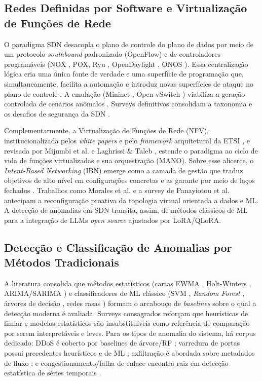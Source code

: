 \documentclass[12pt,a4paper]{article}
\begin{document}
\subsection{Redes Definidas por Software e Virtualização de Funções de Rede}
\label{sec:sdn}

O paradigma SDN desacopla o plano de controle do plano de dados por meio de um
protocolo \textit{southbound} padronizado (OpenFlow) \cite{rA11} e de controladores
programáveis (NOX \cite{rA12}, POX, Ryu \cite{rA116}, OpenDaylight \cite{rA114}, ONOS \cite{rA115}).
Essa centralização lógica cria uma única fonte de verdade e uma superfície de
programação que, simultaneamente, facilita a automação e introduz novas
superfícies de ataque no plano de controle \cite{rA122}\cite{rA123}\cite{rA124}. A emulação
(Mininet \cite{rA14}, Open vSwitch \cite{rA15}) viabiliza a geração controlada de cenários
anômalos \cite{rA19}. Surveys definitivos consolidam a taxonomia e os desafios de
segurança da SDN \cite{rA19}\cite{rA110}.

Complementarmente, a Virtualização de Funções de Rede (NFV), institucionalizada
pelos \textit{white papers} e pelo \textit{framework} arquitetural da ETSI
\cite{rA127}\cite{rA128}\cite{rA129}, e revisada por Mijumbi et al. \cite{rA130}\cite{rA131} e Laghrissi \&
Taleb \cite{rA132}, estende o paradigma ao ciclo de vida de funções virtualizadas e
sua orquestração (MANO). Sobre esse alicerce, o \textit{Intent-Based
Networking} (IBN) emerge como a camada de gestão que traduz objetivos de alto
nível em configurações concretas e as garante por meio de laços fechados
\cite{rA133}. Trabalhos como Morales et al. \cite{rA134} e a survey de Panayiotou et al.
\cite{rA135} antecipam a reconfiguração proativa da topologia virtual orientada a
dados e ML. A detecção de anomalias em SDN transita, assim, de métodos
clássicos de ML \cite{rA126} para a integração de LLMs \textit{open source}
ajustados por LoRA/QLoRA.

\subsection{Detecção e Classificação de Anomalias por Métodos Tradicionais}
\label{sec:ml}

A literatura consolida que métodos estatísticos (cartas EWMA \cite{rA22}, Holt-Winters
\cite{rA21}, ARIMA/SARIMA \cite{rA25}\cite{rA27}) e classificadores de ML clássico (SVM
\cite{rA213}, \textit{Random Forest} \cite{rA210}, árvores de decisão \cite{rA217}, redes
rasas \cite{rA231}) formam o arcabouço de \textit{baselines} sobre o qual a detecção
moderna é avaliada. Surveys consagrados \cite{rA28}\cite{rA29}\cite{rA210}\cite{rA212} reforçam que
heurísticas de limiar e modelos estatísticos são insubstituíveis como
referência de comparação por serem interpretáveis e leves. Para os tipos de
anomalia do sistema, há corpus dedicado: DDoS é coberto por baselines de
árvore/RF \cite{rA222}\cite{rA224}\cite{rA225}; varredura de portas possui precedentes
heurísticos e de ML \cite{rA227}\cite{rA229}; exfiltração é abordada sobre metadados
de fluxo \cite{rA226}; e congestionamento/falha de enlace encontra raiz em detecção
estatística de séries temporais \cite{rA21}\cite{rA232}\cite{rA21}.
\end{document}

